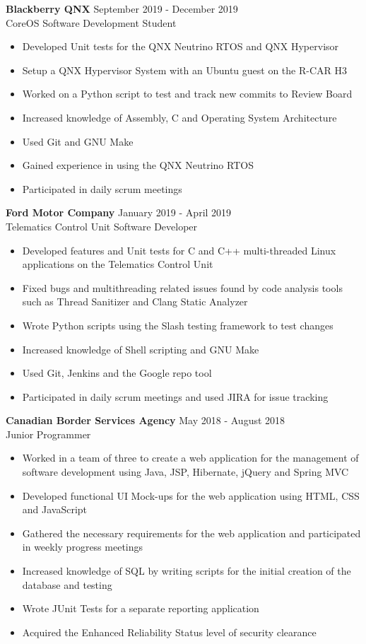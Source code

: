 \documentclass{article}
\begin{document}
\textbf{Blackberry QNX}
\hfill September 2019 - December 2019 \\ CoreOS Software Development Student
\begin{itemize}[noitemsep]
    \item Developed Unit tests for the QNX Neutrino RTOS and QNX Hypervisor
    \item Setup a QNX Hypervisor System with an Ubuntu guest on the R-CAR H3
    \item Worked on a Python script to test and track new commits to Review Board
    \item Increased knowledge of Assembly, C and Operating System Architecture
    \item Used Git and GNU Make
    \item Gained experience in using the QNX Neutrino RTOS
    \item Participated in daily scrum meetings
\end{itemize}

\textbf{Ford Motor Company}
\hfill January 2019 - April 2019 \\ Telematics Control Unit Software Developer
\begin{itemize}[noitemsep]
    \item Developed features and Unit tests for C and C++ multi-threaded Linux applications on the Telematics Control Unit
    \item Fixed bugs and multithreading related issues found by code analysis tools such as Thread Sanitizer and Clang Static Analyzer
    \item Wrote Python scripts using the Slash testing framework to test changes
    \item Increased knowledge of Shell scripting and GNU Make
    \item Used Git, Jenkins and the Google repo tool
    \item Participated in daily scrum meetings and used JIRA for issue tracking
\end{itemize}
\newpage

\textbf{Canadian Border Services Agency}
\hfill May 2018 - August 2018 \\ Junior Programmer
\begin{itemize}[noitemsep]
    \item Worked in a team of three to create a web application for the management of software development using Java, JSP, Hibernate, jQuery and Spring MVC
    \item Developed functional UI Mock-ups for the web application using HTML, CSS and JavaScript
    \item Gathered the necessary requirements for the web application and participated in weekly progress meetings
    \item Increased knowledge of SQL by writing scripts for the initial creation of the database and testing
    \item Wrote JUnit Tests for a separate reporting application
    \item Acquired the Enhanced Reliability Status level of security clearance
\end{itemize}
\end{document}
